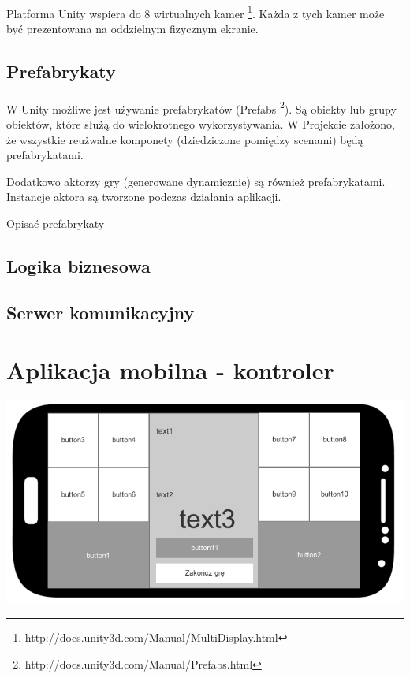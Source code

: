 \documentclass[12pt]{article}
\begin{document}
{{\paragraph{}
Platforma Unity wspiera do 8 wirtualnych kamer \footnote{http://docs.unity3d.com/Manual/MultiDisplay.html}.
Każda z tych kamer może być prezentowana na oddzielnym fizycznym ekranie.

\subsection{Prefabrykaty}
\paragraph{}
W Unity możliwe jest używanie prefabrykatów (Prefabs \footnote{http://docs.unity3d.com/Manual/Prefabs.html}). Są obiekty lub grupy obiektów, które służą do wielokrotnego wykorzystywania. W Projekcie założono, że wszystkie reużwalne komponety (dziedziczone pomiędzy scenami) będą prefabrykatami.

Dodatkowo aktorzy gry (generowane dynamicznie) są również prefabrykatami. Instancje aktora są tworzone podczas działania aplikacji.

{\color{red}Opisać prefabrykaty}

\subsection{Logika biznesowa}
\subsection{Serwer komunikacyjny}
\newpage
\section{Aplikacja mobilna - kontroler}

\begin{center}
\includegraphics[width=1\textwidth]{images/button_mockup.png}
\end{center}
}}
\end{document}
